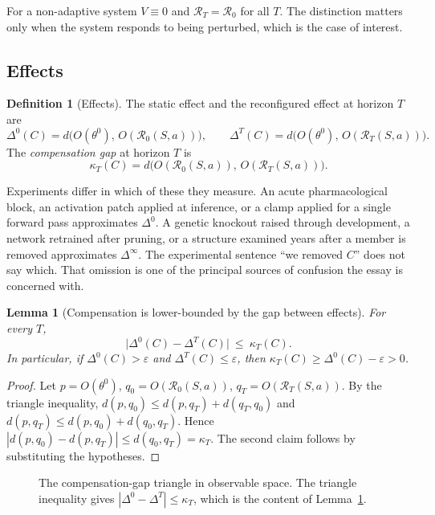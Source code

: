 \documentclass[11pt]{article}
\newtheorem{lemma}[theorem]{Lemma}
\theoremstyle{definition}
\newtheorem{definition}[theorem]{Definition}
\theoremstyle{remark}
\newcommand{\Rop}{\mathcal{R}}
\begin{document}
For a non-adaptive system $V\equiv 0$ and $\Rop_T=\Rop_0$ for all $T$. The distinction matters only when the system responds to being perturbed, which is the case of interest.

\subsection{Effects}

\begin{definition}[Effects]
The static effect and the reconfigured effect at horizon $T$ are
\[
\Delta^{0}(C)=d\bigl(O(\theta^0),\,O(\Rop_0(S,a))\bigr),\qquad
\Delta^{T}(C)=d\bigl(O(\theta^0),\,O(\Rop_T(S,a))\bigr).
\]
The \emph{compensation gap} at horizon $T$ is
\[
\kappa_T(C)=d\bigl(O(\Rop_0(S,a)),\,O(\Rop_T(S,a))\bigr).
\]
\end{definition}

Experiments differ in which of these they measure. An acute pharmacological block, an activation patch applied at inference, or a clamp applied for a single forward pass approximates $\Delta^0$. A genetic knockout raised through development, a network retrained after pruning, or a structure examined years after a member is removed approximates $\Delta^\infty$. The experimental sentence ``we removed $C$'' does not say which. That omission is one of the principal sources of confusion the essay is concerned with.

\begin{lemma}[Compensation is lower-bounded by the gap between effects]\label{lem:gap}
For every $T$,
\[
\bigl|\Delta^0(C)-\Delta^T(C)\bigr|\ \le\ \kappa_T(C).
\]
In particular, if $\Delta^0(C)>\varepsilon$ and $\Delta^T(C)\le\varepsilon$, then $\kappa_T(C)\ge\Delta^0(C)-\varepsilon>0$.
\end{lemma}
\begin{proof}
Let $p=O(\theta^0)$, $q_0=O(\Rop_0(S,a))$, $q_T=O(\Rop_T(S,a))$. By the triangle inequality, $d(p,q_0)\le d(p,q_T)+d(q_T,q_0)$ and $d(p,q_T)\le d(p,q_0)+d(q_0,q_T)$. Hence $|d(p,q_0)-d(p,q_T)|\le d(q_0,q_T)=\kappa_T$. The second claim follows by substituting the hypotheses.
\end{proof}

\begin{figure}[ht]
\centering
{}
\caption{The compensation-gap triangle in observable space. The triangle inequality gives $|\Delta^0-\Delta^T|\le\kappa_T$, which is the content of Lemma~\ref{lem:gap}.}
\end{figure}
\end{document}

